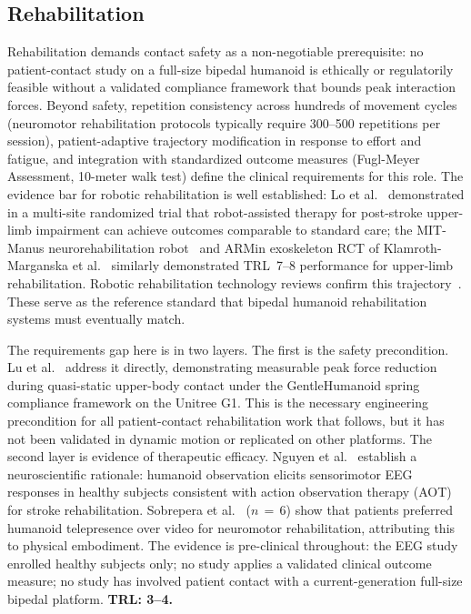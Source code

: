 \subsection{Rehabilitation}
\label{sec:rehabilitation}

Rehabilitation demands contact safety as a non-negotiable prerequisite: no
patient-contact study on a full-size bipedal humanoid is ethically or
regulatorily feasible without a validated compliance framework that bounds peak
interaction forces. Beyond safety, repetition consistency across hundreds of
movement cycles (neuromotor rehabilitation protocols typically require 300--500
repetitions per session), patient-adaptive trajectory modification in response to
effort and fatigue, and integration with standardized outcome measures
(Fugl-Meyer Assessment, 10-meter walk test) define the clinical requirements for
this role. The evidence bar for robotic rehabilitation is well established:
Lo et al.~\cite{lo2010robot} demonstrated in a multi-site randomized trial that
robot-assisted therapy for post-stroke upper-limb impairment can achieve
outcomes comparable to standard care; the MIT-Manus neurorehabilitation
robot~\cite{krebs1998robot} and ARMin exoskeleton RCT of
Klamroth-Marganska et al.~\cite{klamroth2014armin} similarly demonstrated
TRL~7--8 performance for upper-limb rehabilitation. Robotic rehabilitation
technology reviews confirm this trajectory~\cite{poli2013robotic}. These serve
as the reference standard that bipedal humanoid rehabilitation systems must
eventually match.

The requirements gap here is in two layers. The first is the safety precondition.
Lu et al.~\cite{lu2025gentlehumanoid} address it directly, demonstrating
measurable peak force reduction during quasi-static upper-body contact under the
GentleHumanoid spring compliance framework on the Unitree G1. This is the
necessary engineering precondition for all patient-contact rehabilitation work
that follows, but it has not been validated in dynamic motion or replicated on
other platforms. The second layer is evidence of therapeutic efficacy. Nguyen et
al.~\cite{nguyen2024eeg} establish a neuroscientific rationale: humanoid
observation elicits sensorimotor EEG responses in healthy subjects consistent with
action observation therapy (AOT) for stroke rehabilitation. Sobrepera et
al.~\cite{sobrepera2022feasibility} ($n\,=\,6$) show that patients preferred
humanoid telepresence over video for neuromotor rehabilitation, attributing this
to physical embodiment. The evidence is pre-clinical throughout: the EEG study
enrolled healthy subjects only; no study applies a validated clinical outcome
measure; no study has involved patient contact with a current-generation full-size
bipedal platform. \textbf{TRL: 3--4.}

